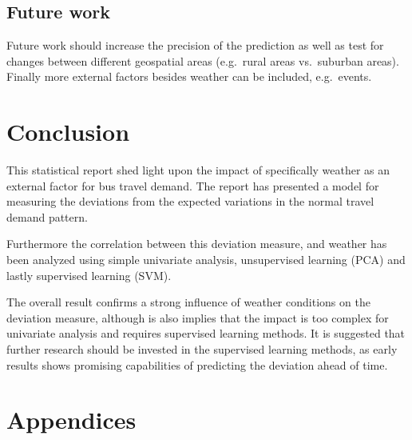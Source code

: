 \documentclass[a4paper,11pt]{article}
\begin{document}
\subsection{Future work}
Future work should increase the precision of the prediction as well as test for changes between different geospatial areas (e.g.\ rural areas vs.\ suburban areas). Finally more external factors besides weather can be included, e.g.\ events.

\section{Conclusion}
This statistical report shed light upon the impact of specifically weather as an external factor for bus travel demand. The report has presented a model for measuring the deviations from the expected variations in the normal travel demand pattern.

Furthermore the correlation between this deviation measure, and weather has been analyzed using simple univariate analysis, unsupervised learning (PCA) and lastly supervised learning (SVM).

The overall result confirms a strong influence of weather conditions on the deviation measure, although is also implies that the impact is too complex for univariate analysis and requires supervised learning methods. It is suggested that further research should be invested in the supervised learning methods, as early results shows promising capabilities of predicting the deviation ahead of time.

\clearpage
\begin{spacing}{1}
  
  
\end{spacing}

\clearpage
\appendix
\section*{Appendices}
\renewcommand{\thesubsection}{\Alph{subsection}}


\clearpage

\clearpage

\end{document}
